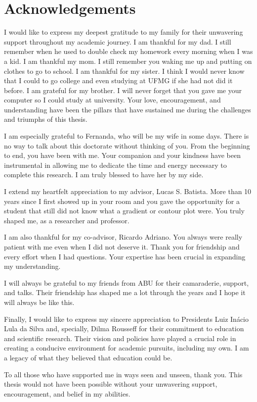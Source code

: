 \newpage

\chapter*{Acknowledgements}

	I would like to express my deepest gratitude to my family for their unwavering support throughout my academic journey. I am thankful for my dad. I still remember when he used to double check my homework every morning when I was a kid. I am thankful my mom. I still remember you waking me up and putting on clothes to go to school. I am thankful for my sister. I think I would never know that I could to go college and even studying at UFMG if she had not did it before. I am grateful for my brother. I will never forget that you gave me your computer so I could study at university. Your love, encouragement, and understanding have been the pillars that have sustained me during the challenges and triumphs of this thesis.
	
	I am especially grateful to Fernanda, who will be my wife in some days. There is no way to talk about this doctorate without thinking of you. From the beginning to end, you have been with me. Your companion and your kindness have been instrumental in allowing me to dedicate the time and energy necessary to complete this research. I am truly blessed to have her by my side.
	
	I extend my heartfelt appreciation to my advisor, Lucas S. Batista. More than 10 years since I first showed up in your room and you gave the opportunity for a student that still did not know what a gradient or contour plot were. You truly shaped me, as a researcher and professor.
	
	I am also thankful for my co-advisor, Ricardo Adriano. You always were really patient with me even when I did not deserve it. Thank you for friendship and every effort when I had questions. Your expertise has been crucial in expanding my understanding.
	
	I will always be grateful to my friends from ABU for their camaraderie, support, and talks. Their friendship has shaped me a lot through the years and I hope it will always be like this.
	
	Finally, I would like to express my sincere appreciation to Presidents Luiz Inácio Lula da Silva and, specially, Dilma Rousseff for their commitment to education and scientific research. Their vision and policies have played a crucial role in creating a conducive environment for academic pursuits, including my own. I am a legacy of what they believed that education could be.
	
	To all those who have supported me in ways seen and unseen, thank you. This thesis would not have been possible without your unwavering support, encouragement, and belief in my abilities.
	
	\thispagestyle{empty}